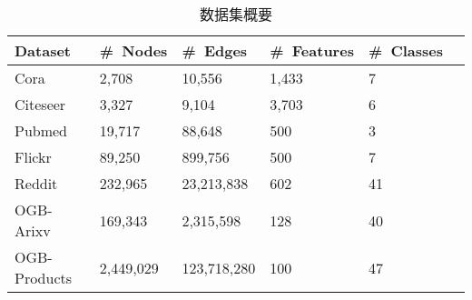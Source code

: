 \begin{table}[h]
    \large
    \centering
    \caption{数据集概要}
    \label{tab:dataset}
    \begin{tabular}{llllll}
    \hline
    Dataset      & \#~Nodes   & \#~Edges     & \#~Features & \#~Classes \\ \hline
    Cora         & 2,708      & 10,556        & 1,433      & 7            \\
    Citeseer     & 3,327	     & 9,104	   & 3,703	    & 6            \\
    Pubmed       & 19,717	 & 88,648	   & 500	    & 3            \\
    Flickr       & 89,250    & 899,756     & 500        & 7            \\
    Reddit       & 232,965   & 23,213,838  & 602        & 41           \\
    OGB-Arixv    & 169,343   & 2,315,598   & 128        & 40           \\
    OGB-Products & 2,449,029 & 123,718,280 & 100        & 47           \\ \hline
    \end{tabular}%
    \end{table}


